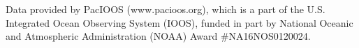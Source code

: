 \documentclass{ametsocV5}
\begin{document}







\acknowledgments
 Data provided by PacIOOS (www.pacioos.org), which is a part of the U.S. Integrated Ocean Observing System (IOOS), funded in part by National Oceanic and Atmospheric Administration (NOAA) Award \#NA16NOS0120024.
\end{document}
